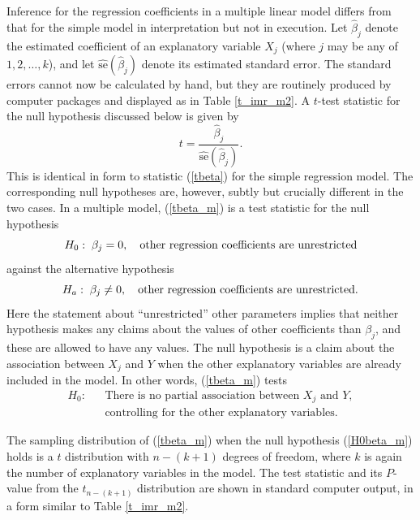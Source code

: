 Inference for the regression coefficients in a multiple
linear model differs from that for the simple model in interpretation
but not in execution. Let $\hat{\beta}_{j}$ denote the estimated
coefficient of an explanatory variable $X_{j}$ (where $j$ may be any of
$1,2,\dots,k$), and let $\hat{\text{se}}(\hat{\beta}_{j})$ denote its
estimated standard error. The standard errors cannot now be calculated
by hand, but they are routinely produced by computer packages and
displayed as in Table \ref{t_imr_m2}. A $t$-test statistic for the null
hypothesis discussed below is given by
\begin{equation}
t=\frac{\hat{\beta}_{j}}{\hat{\text{se}}(\hat{\beta}_{j})}.
\label{tbeta_m}
\end{equation}
This is identical in form to statistic
(\ref{tbeta}) for the simple regression model. The corresponding null
hypotheses are, however, subtly but crucially different in
the two cases. In a multiple model, (\ref{tbeta_m}) is a test statistic
for the null hypothesis
\begin{equation}
H_{0}:\; \beta_{j}=0, \hspace*{1em}\text{other regression coefficients
are unrestricted}
\label{H0beta_m}
\end{equation}
against the alternative hypothesis
\[
H_{a}:\; \beta_{j}\ne0, \hspace*{1em}\text{other regression coefficients
are unrestricted}.
\]
Here the statement about ``unrestricted'' other parameters implies that
neither hypothesis makes any claims about the values of other
coefficients than $\beta_{j}$, and these are allowed to have any
values. The null hypothesis is a claim about the association between
$X_{j}$ and $Y$ when the other explanatory variables are already
included in the model. In other words, (\ref{tbeta_m}) tests
\begin{eqnarray*}
H_{0}:& & \text{There is no partial association between }
X_{j} \text{ and } Y,\\
&&  \text{controlling for the other explanatory
variables.}
\end{eqnarray*}

The sampling distribution of (\ref{tbeta_m}) when the null hypothesis
(\ref{H0beta_m}) holds is a $t$ distribution with $n-(k+1)$ degrees
of freedom, where $k$ is again the number of explanatory variables in the
model. The test statistic and its $P$-value from the $t_{n-(k+1)}$
distribution are shown in standard computer output, in a form similar to
Table \ref{t_imr_m2}.


